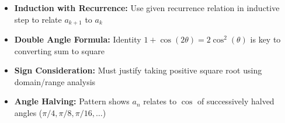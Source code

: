 \begin{takeaways}
\begin{itemize}
\item \textbf{Induction with Recurrence:} Use given recurrence relation in inductive step to relate $a_{k+1}$ to $a_k$
\item \textbf{Double Angle Formula:} Identity $1 + \cos(2\theta) = 2\cos^2(\theta)$ is key to converting sum to square
\item \textbf{Sign Consideration:} Must justify taking positive square root using domain/range analysis
\item \textbf{Angle Halving:} Pattern shows $a_n$ relates to $\cos$ of successively halved angles ($\pi/4, \pi/8, \pi/16, \ldots$)
\end{itemize}
\end{takeaways}
